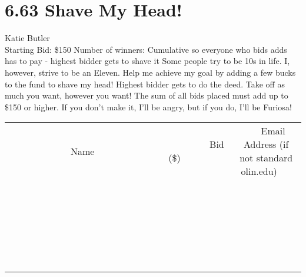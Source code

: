 \documentclass[11pt]{article}
\begin{document}
\section*{6.63 Shave My Head!}
Katie Butler
\\
Starting Bid: \$150
\newline
Number of winners: Cumulative so everyone who bids adds has to pay - highest bidder gets to shave it
\newline
Some people try to be 10s in life. I, however, strive to be an Eleven. Help me achieve my goal by adding a few bucks to the fund to shave my head! Highest bidder gets to do the deed. Take off as much you want, however you want! The sum of all bids placed must add up to \$150 or higher. If you don't make it, I'll be angry, but if you do, I'll be Furiosa!
\\[6ex]
\begin{tabular}{c c c}
~~~~~~~~~~~~~Name~~~~~~~~~~~~~ & ~~~~~~~~~Bid (\$)~~~~~~~~~  & ~~~Email Address (if not standard olin.edu)~~~\\
 & & \\
\hline
 & & \\
\hline
 & & \\
\hline
 & & \\
\hline
 & & \\
\hline
 & & \\
\hline
 & & \\
\hline
 & & \\
\hline
 & & \\
\hline
 & & \\
\hline
 & & \\
\hline
 & & \\
\hline
 & & \\
\hline
 & & \\
\hline
 & & \\
\hline
 & & \\
\hline
 & & \\
\hline
 & & \\
\hline
 & & \\
\hline
 & & \\
\hline
 & & \\
\hline
 & & \\
\hline
 & & \\
\hline
 & & \\
\hline
 & & \\
\hline
 & & \\
\hline
\end{tabular}
\newpage
\end{document}
